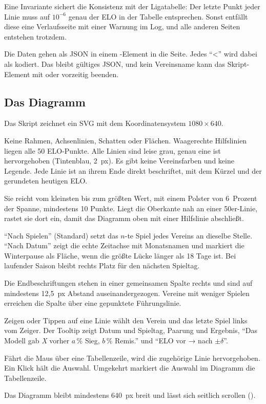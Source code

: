 Eine Invariante sichert die Konsistenz mit der Ligatabelle: Der letzte Punkt
jeder Linie muss auf $10^{-6}$ genau der ELO in der Tabelle entsprechen.
Sonst entfällt diese eine Verlaufsseite mit einer Warnung im Log, und alle
anderen Seiten entstehen trotzdem.

Die Daten gehen als JSON in einem
-Element in die Seite. Jedes
\enquote{\textless} wird dabei als  kodiert. Das
bleibt gültiges JSON, und kein Vereinsname kann das Skript-Element mit
 oder \code{<!--} vorzeitig beenden.

\subsection*{Das Diagramm}

Das Skript  zeichnet ein SVG mit dem
Koordinatensystem $1080 \times 640$.

\begin{description}[font=\sffamily\bfseries\small]
  \item[Wenig Tinte] Keine Rahmen, Achsenlinien, Schatten oder Flächen.
        Waagerechte Hilfslinien liegen alle 50 ELO-Punkte. Alle Linien sind
        leise grau, genau eine ist hervorgehoben (Tintenblau, 2~px). Es gibt
        keine Vereinsfarben und keine Legende. Jede Linie ist an ihrem Ende
        direkt beschriftet, mit dem Kürzel und der gerundeten heutigen ELO.
  \item[Senkrechte Skala] Sie reicht vom kleinsten bis zum größten Wert, mit
        einem Polster von 6~Prozent der Spanne, mindestens 10 Punkte. Liegt
        die Oberkante nah an einer 50er-Linie, rastet sie dort ein, damit das
        Diagramm oben mit einer Hilfslinie abschließt.
  \item[Zwei Zeitachsen] \enquote{Nach Spielen} (Standard) setzt das
        $n$-te Spiel jedes Vereins an dieselbe Stelle. \enquote{Nach Datum}
        zeigt die echte Zeitachse mit Monatsnamen und markiert die
        Winterpause als Fläche, wenn die größte Lücke länger als 18 Tage ist.
        Bei laufender Saison bleibt rechts Platz für den nächsten Spieltag.
  \item[Beschriftungen] Die Endbeschriftungen stehen in einer gemeinsamen
        Spalte rechts und sind auf mindestens 12{,}5~px Abstand
        auseinandergezogen. Vereine mit weniger Spielen erreichen die Spalte
        über eine gepunktete Führungslinie.
  \item[Tooltip] Zeigen oder Tippen auf eine Linie wählt den Verein und das
        letzte Spiel links vom Zeiger. Der Tooltip zeigt Datum und Spieltag,
        Paarung und Ergebnis, \enquote{Das Modell gab \emph{X} vorher
        $a$\,\% Sieg, $b$\,\% Remis.} und \enquote{ELO vor → nach $\pm\delta$}.
  \item[Tabelle und Diagramm] Fährt die Maus über eine Tabellenzeile, wird
        die zugehörige Linie hervorgehoben. Ein Klick hält die Auswahl.
        Umgekehrt markiert die Auswahl im Diagramm die Tabellenzeile.
  \item[Telefon] Das Diagramm bleibt mindestens 640~px breit und lässt sich
        seitlich scrollen ().
\end{description}
